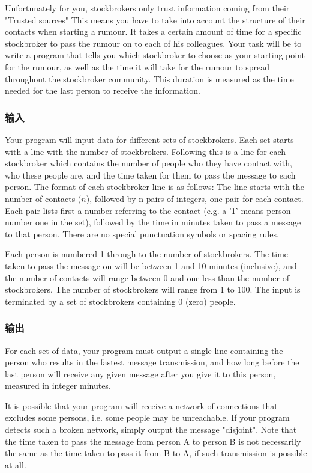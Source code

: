 Unfortunately for you, stockbrokers only trust information coming from their "Trusted sources" This means you have to take into account the structure of their contacts when starting a rumour. It takes a certain amount of time for a specific stockbroker to pass the rumour on to each of his colleagues. Your task will be to write a program that tells you which stockbroker to choose as your starting point for the rumour, as well as the time it will take for the rumour to spread throughout the stockbroker community. This duration is measured as the time needed for the last person to receive the information.

\subsubsection{输入}
Your program will input data for different sets of stockbrokers. Each set starts with a line with the number of stockbrokers. Following this is a line for each stockbroker which contains the number of people who they have contact with, who these people are, and the time taken for them to pass the message to each person. The format of each stockbroker line is as follows: The line starts with the number of contacts ($n$), followed by n pairs of integers, one pair for each contact. Each pair lists first a number referring to the contact (e.g. a '1' means person number one in the set), followed by the time in minutes taken to pass a message to that person. There are no special punctuation symbols or spacing rules. 

Each person is numbered 1 through to the number of stockbrokers. The time taken to pass the message on will be between 1 and 10 minutes (inclusive), and the number of contacts will range between 0 and one less than the number of stockbrokers. The number of stockbrokers will range from 1 to 100. The input is terminated by a set of stockbrokers containing 0 (zero) people. 

\subsubsection{输出}
For each set of data, your program must output a single line containing the person who results in the fastest message transmission, and how long before the last person will receive any given message after you give it to this person, measured in integer minutes. 

It is possible that your program will receive a network of connections that excludes some persons, i.e. some people may be unreachable. If your program detects such a broken network, simply output the message "disjoint". Note that the time taken to pass the message from person A to person B is not necessarily the same as the time taken to pass it from B to A, if such transmission is possible at all.

